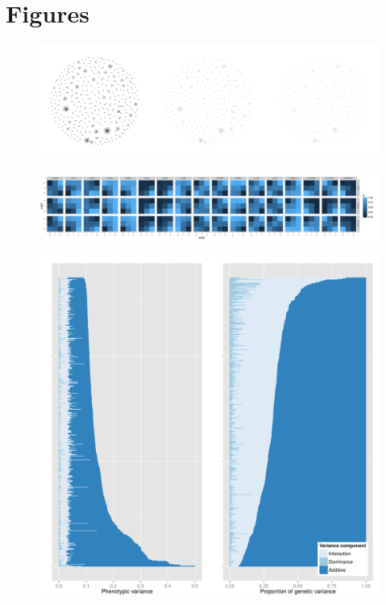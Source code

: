 \documentclass{article}
\begin{document}
\clearpage
\section{Figures}
\setcounter{figure}{0}

\begin{figure}[H]
\centering
\includegraphics[width=5in]{hairballs_all_reps.pdf}
\caption{}
\end{figure}
\clearpage

\begin{figure}
\centering
\includegraphics[width=5in]{gpbonfrep.pdf}
\caption{}
\end{figure}
\clearpage

\begin{figure}
\centering
\includegraphics[width=5in]{variance_components.pdf}
\caption{}
\end{figure}
\clearpage
\end{document}
